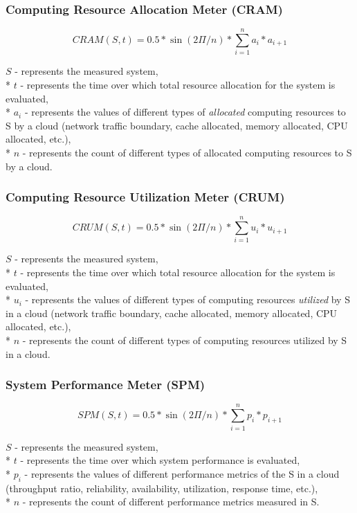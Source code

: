 \documentclass{uvamscse}
\begin{document}
\subsubsection{Computing Resource Allocation Meter (CRAM)}
\begin{center}
  $$CRAM(S,t) = 0.5 * \sin(2\Pi/n) * \sum_{i=1}^{n}a_i*a_{i+1}$$
\end{center}
  \texttt{$S$} - represents the measured system, \\*
  \texttt{$t$} - represents the time over which total resource allocation for the system is evaluated, \\*
  \texttt{$a_i$} - represents the values of different types of \textit{allocated} computing resources to S by a cloud (network traffic boundary, cache allocated, memory allocated, CPU allocated, etc.), \\*
  \texttt{$n$} - represents the count of different types of allocated computing resources to S by a cloud.

\subsubsection{Computing Resource Utilization Meter (CRUM)}
\begin{center}
  $$CRUM(S,t) = 0.5 * \sin(2\Pi/n) * \sum_{i=1}^{n}u_i*u_{i+1}$$
\end{center}
  \texttt{$S$} - represents the measured system, \\*
  \texttt{$t$} - represents the time over which total resource allocation for the system is evaluated, \\*
  \texttt{$u_i$} - represents the values of different types of computing resources \textit{utilized} by S in a cloud (network traffic boundary, cache allocated, memory allocated, CPU allocated, etc.), \\*
  \texttt{$n$} - represents the count of different types of computing resources utilized by S in a cloud.

\subsubsection{System Performance Meter (SPM)}
\begin{center}
  $$SPM(S,t) = 0.5 * \sin(2\Pi/n) * \sum_{i=1}^{n}p_i*p_{i+1}$$
\end{center}
  \texttt{$S$} - represents the measured system, \\*
  \texttt{$t$} - represents the time over which system performance is evaluated, \\*
  \texttt{$p_i$} - represents the values of different performance metrics of the S in a cloud  (throughput ratio, reliability, availability, utilization, response time, etc.), \\*
  \texttt{$n$} - represents the count of different performance metrics measured in S.
\end{document}

